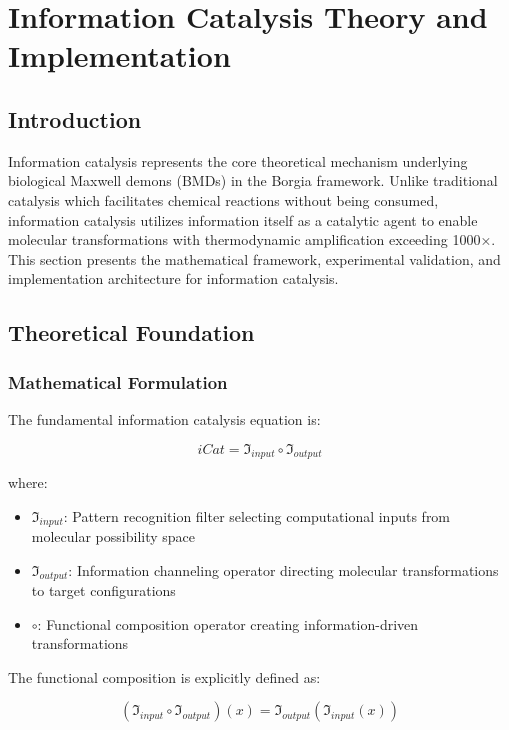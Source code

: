 \section{Information Catalysis Theory and Implementation}

\subsection{Introduction}

Information catalysis represents the core theoretical mechanism underlying biological Maxwell demons (BMDs) in the Borgia framework. Unlike traditional catalysis which facilitates chemical reactions without being consumed, information catalysis utilizes information itself as a catalytic agent to enable molecular transformations with thermodynamic amplification exceeding 1000×. This section presents the mathematical framework, experimental validation, and implementation architecture for information catalysis.

\subsection{Theoretical Foundation}

\subsubsection{Mathematical Formulation}

The fundamental information catalysis equation is:

\begin{equation}
iCat = \mathfrak{I}_{input} \circ \mathfrak{I}_{output}
\end{equation}

where:
\begin{itemize}
\item $\mathfrak{I}_{input}$: Pattern recognition filter selecting computational inputs from molecular possibility space
\item $\mathfrak{I}_{output}$: Information channeling operator directing molecular transformations to target configurations  
\item $\circ$: Functional composition operator creating information-driven transformations
\end{itemize}

The functional composition is explicitly defined as:

\begin{equation}
(\mathfrak{I}_{input} \circ \mathfrak{I}_{output})(x) = \mathfrak{I}_{output}(\mathfrak{I}_{input}(x))
\end{equation}

